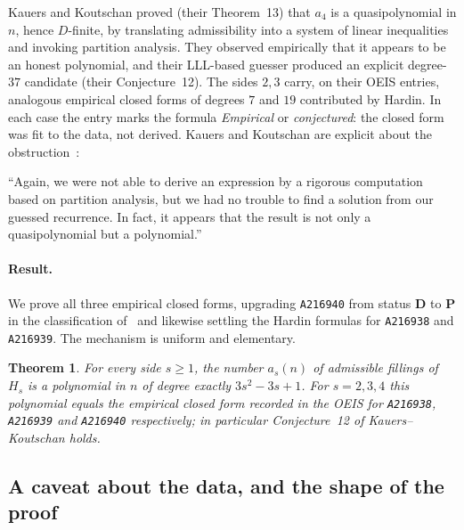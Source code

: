 \documentclass[11pt]{article}
\theoremstyle{plain}
\newtheorem{theorem}{Theorem}
\theoremstyle{definition}
\theoremstyle{remark}
\newcommand{\OEIS}[1]{\texttt{#1}}
\newenvironment{callout}
  {\par\smallskip\noindent\begin{center}\begin{minipage}{0.95\linewidth}%
   \color{periapsisInk}\small\itshape\rule{0pt}{1ex}}
  {\end{minipage}\end{center}\smallskip}
\begin{document}
Kauers and Koutschan proved (their Theorem~13) that $a_4$ is a quasipolynomial in $n$, hence
$D$-finite, by translating admissibility into a system of linear inequalities and invoking partition
analysis. They observed empirically that it appears to be an honest polynomial, and their LLL-based
guesser produced an explicit degree-$37$ candidate (their Conjecture~12). The sides $2,3$ carry,
on their OEIS entries, analogous empirical closed forms of degrees $7$ and $19$ contributed by
Hardin. In each case the entry marks the formula \emph{Empirical} or \emph{conjectured}: the closed
form was fit to the data, not derived. Kauers and Koutschan are explicit about the
obstruction~\cite[\S5.1]{KK23}:

\begin{callout}
``Again, we were not able to derive an expression by a rigorous computation based on partition
analysis, but we had no trouble to find a solution from our guessed recurrence. In fact, it appears
that the result is not only a quasipolynomial but a polynomial.''
\end{callout}

\paragraph{Result.} We prove all three empirical closed forms, upgrading \OEIS{A216940} from
status \textbf{D} to \textbf{P} in the classification of~\cite{KK23} and likewise settling the
Hardin formulas for \OEIS{A216938} and \OEIS{A216939}. The mechanism is uniform and elementary.

\begin{theorem}\label{main}
For every side $s\ge 1$, the number $a_s(n)$ of admissible fillings of $H_s$ is a polynomial in $n$
of degree exactly $3s^2-3s+1$. For $s=2,3,4$ this polynomial equals the empirical closed form
recorded in the OEIS for \OEIS{A216938}, \OEIS{A216939} and \OEIS{A216940} respectively; in
particular Conjecture~12 of Kauers--Koutschan holds.
\end{theorem}

\subsection{A caveat about the data, and the shape of the proof}\label{sub:caveat}
\end{document}

